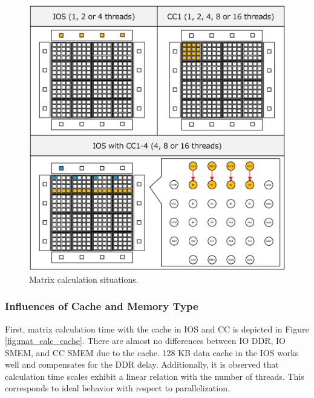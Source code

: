\documentclass[conference,compsoc]{IEEEtran}
\begin{document}
\begin{figure}[t]
  \centering
  \includegraphics[width=0.8\linewidth]{../figure/matrix_calculation.eps}
  \vspace{-4mm}
  \caption{\label{fig:mat_calc}
    Matrix calculation situations.}
  \vspace{-5mm}
\end{figure}

\vspace{-3mm}
\subsubsection{Influences of Cache and Memory Type}
\label{sec:cache_and_memory}
First, matrix calculation time with the cache in IOS and CC is depicted in Figure \ref{fig:mat_calc_cache}.
There are almost no differences between IO DDR, IO SMEM, and CC SMEM due to the cache.
128 KB data cache in the IOS works well and compensates for the DDR delay.
Additionally, it is observed that calculation time scales exhibit a linear relation with the number of threads.
This corresponds to ideal behavior with respect to parallelization.
\end{document}
